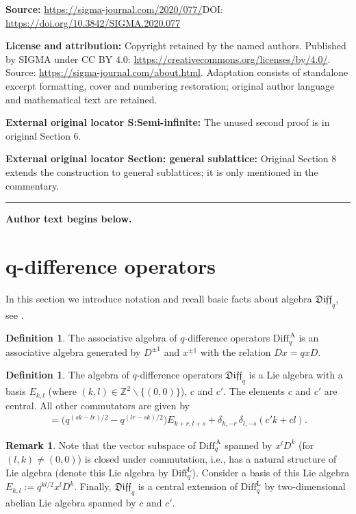\documentclass[11pt]{article}
\numberwithin{equation}{section}
\theoremstyle{definition}
\newtheorem{Remark}[Theorem]{Remark}
\newtheorem{Definition}[Theorem]{Definition}
\newcommand{\qaD}{\mathrm{Diff}_q^{\, \mathrm{A}}}
\newcommand{\qD}{\mathfrak{Diff}_q}
\begin{document}
\noindent\textbf{Source:} \url{https://sigma-journal.com/2020/077/}\quad DOI: \url{https://doi.org/10.3842/SIGMA.2020.077}\par
\noindent\textbf{License and attribution:} Copyright retained by the named authors. Published by SIGMA under CC BY 4.0: \url{https://creativecommons.org/licenses/by/4.0/}. Source: \url{https://sigma-journal.com/about.html}. Adaptation consists of standalone excerpt formatting, cover and numbering restoration; original author language and mathematical text are retained.\par
\noindent\textbf{External original locator S:Semi-infinite:} The unused second proof is in original Section 6.\par
\noindent\textbf{External original locator Section: general sublattice:} Original Section 8 extends the construction to general sublattices; it is only mentioned in the commentary.\par
\medskip\hrule\medskip\noindent\textbf{Author text begins below.}\par
\setcounter{section}{1}
\setcounter{subsection}{0}
\setcounter{subsubsection}{0}
\setcounter{Theorem}{5}
\setcounter{equation}{8}
\section[$q$-difference operators]{$\boldsymbol{q}$-difference operators} \label{q-dif}

In this section we introduce notation and recall basic facts about algebra $\qD$, see \cite{FFZ, GL,KR93}.
\begin{Definition}
The associative algebra of $q$-difference operators $\qaD$ is an associative algebra generated by $D^{\pm 1}$ and $x^{\pm 1}$ with the relation $Dx=qxD$.
\end{Definition}

\begin{Definition}
The algebra of $q$-difference operators $\qD$ is a Lie algebra with a basis $E_{k,l}$ {\upshape(}where $(k, l) \in \mathbb{Z}^2 \backslash \{(0,0) \}${\upshape)}, $c$ and $c'$. The elements $c$ and $c'$ are central. All other commutators are given by
\begin{gather}
[ E_{k,l} , E_{r,s} ] = \big( q^{(sk-lr)/2}-q^{(lr-sk)/2} \big) E_{k+r, l+s} + \delta_{k, -r} \, \delta_{l, -s} ( c' k + c l ). \label{qDc}
\end{gather}
\end{Definition}

\begin{Remark}Note that the vector subspace of $\qaD$ spanned by $x^l D^k$ (for $(l,k) \neq (0,0)$) is closed under commutation, i.e., has a natural structure of Lie algebra (denote this Lie algebra by $\mathrm{Diff}_q^{\mathrm{L}}$). Consider a basis of this Lie algebra $E_{k,l} := q^{kl/2} x^l D^k$. Finally, $\qD$ is a central extension of $\mathrm{Diff}_q^{\mathrm{L}}$ by two-dimensional abelian Lie algebra spanned by $c$ and $c'$.
\end{Remark}
\end{document}
